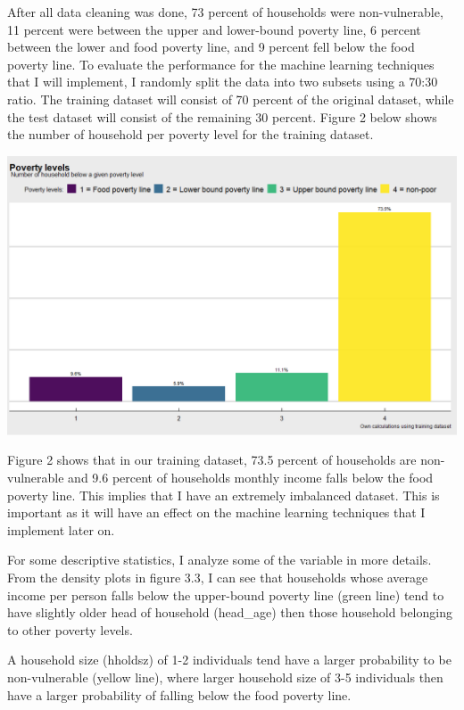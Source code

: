 \documentclass[11pt,preprint, authoryear]{elsarticle}
\let\origfigure\figure
\let\endorigfigure\endfigure
\renewenvironment{figure}[1][2] {
    \expandafter\origfigure\expandafter[H]
} {
    \endorigfigure
}
\numberwithin{equation}{section}
\numberwithin{figure}{section}
\numberwithin{table}{section}
\begin{document}
After all data cleaning was done, 73 percent of households were
non-vulnerable, 11 percent were between the upper and lower-bound
poverty line, 6 percent between the lower and food poverty line, and 9
percent fell below the food poverty line. To evaluate the performance
for the machine learning techniques that I will implement, I randomly
split the data into two subsets using a 70:30 ratio. The training
dataset will consist of 70 percent of the original dataset, while the
test dataset will consist of the remaining 30 percent. Figure 2 below
shows the number of household per poverty level for the training
dataset.

\begin{figure}
\centerline{\includegraphics[scale=0.65]{plot1.png}}
\caption{Number of household per poverty level}
\end{figure}

Figure 2 shows that in our training dataset, 73.5 percent of households
are non-vulnerable and 9.6 percent of households monthly income falls
below the food poverty line. This implies that I have an extremely
imbalanced dataset. This is important as it will have an effect on the
machine learning techniques that I implement later on.

For some descriptive statistics, I analyze some of the variable in more
details. From the density plots in figure 3.3, I can see that households
whose average income per person falls below the upper-bound poverty line
(green line) tend to have slightly older head of household (head\_age)
then those household belonging to other poverty levels.

A household size (hholdsz) of 1-2 individuals tend have a larger
probability to be non-vulnerable (yellow line), where larger household
size of 3-5 individuals then have a larger probability of falling below
the food poverty line.
\end{document}
